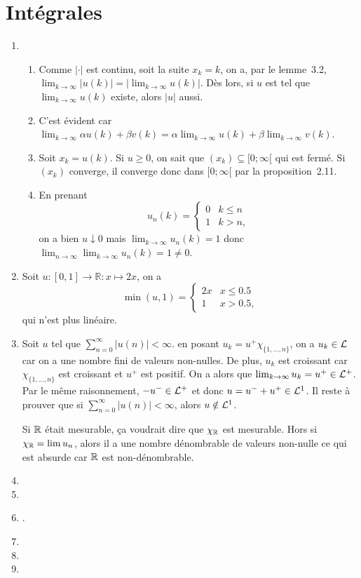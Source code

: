 \section{Intégrales}
\begin{enumerate}
  \item
    \begin{enumerate}
      \item Comme $|\cdot|$ est continu, soit la suite $x_k = k$, on a, par le lemme~3.2,
        $\lim_{k\to\infty} |u(k)| = |\lim_{k\to\infty} u(k)|$.
        Dès lors, si $u$ est tel que $\lim_{k\to\infty} u(k)$ existe,
        alors $|u|$ aussi.
      \item C'est évident car
        $\lim_{k\to\infty} \alpha u(k) + \beta v(k) = \alpha \lim_{k\to\infty} u(k) + \beta \lim_{k\to\infty} v(k)$.
      \item Soit $x_k = u(k)$. Si $u \geq 0$, on sait que $(x_k) \subseteq [0;\infty[$ qui est fermé.
        Si $(x_k)$ converge, il converge donc dans $[0;\infty[$ par la proposition~2.11.
      \item En prenant
        \[
          u_n(k) =
          \begin{cases}
            0 & k \leq n\\
            1 & k > n,
          \end{cases}
        \]
        on a bien $u \downarrow 0$ mais $\lim_{k\to\infty} u_n(k) = 1$ donc $\lim_{n\to\infty} \lim_{k\to\infty}u_n(k) = 1 \neq 0$.
    \end{enumerate}
  \item %
    Soit $u:[0,1]\to\mathbb{R} : x \mapsto 2x$, on a
    \[
      \min(u,1) =
      \begin{cases}
        2x & x \leq 0.5\\
        1 & x > 0.5,
      \end{cases}
    \]
    qui n'est plus linéaire.
  \item %
    Soit $u$ tel que $\sum_{n=0}^\infty |u(n)| < \infty$.
    en posant $u_k = u^+ \chi_{\{1,\ldots,n\}}$, on a $u_k \in \mathcal{L}$ car on a une nombre fini de valeurs non-nulles.
    De plus, $u_k$ est croissant car $\chi_{\{1,\ldots,n\}}$ est croissant et $u^+$ est positif.
    On a alors que $\lim_{k\to\infty} u_k = u^+ \in \mathcal{L}^+$.
    Par le même raisonnement, $-u^- \in \mathcal{L}^+$ et donc $u = u^- + u^+ \in \mathcal{L}^1$.
    Il reste à prouver que si $\sum_{n=0}^\infty |u(n)| < \infty$, alors $u \notin \mathcal{L}^1$.

    Si $\mathbb{R}$ était mesurable, ça voudrait dire que $\chi_{\mathbb{R}}$ est mesurable.
    Hors si $\chi_{\mathbb{R}} = \lim u_n$, alors il a une nombre dénombrable de valeurs non-nulle
    ce qui est absurde car $\mathbb{R}$ est non-dénombrable.
  \item %
    \nosolution
  \item %
    \nosolution
  \item %
    .
  \item %
    \nosolution
  \item %
    \nosolution
  \item %
    \nosolution
\end{enumerate}





